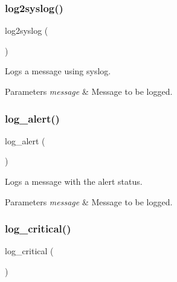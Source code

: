 \subsubsection{\texorpdfstring{log2syslog()}{log2syslog()}}
{\footnotesize\ttfamily log2syslog (\begin{DoxyParamCaption}\item[{message}]{ }\end{DoxyParamCaption})}



Logs a message using syslog. 


\begin{DoxyParams}{Parameters}
{\em message} & Message to be logged. \\
\hline
\end{DoxyParams}
\mbox{\label{group__log_ga36dd3783b9386bf202d2c81c24470466}} 
\subsubsection{\texorpdfstring{log\+\_\+alert()}{log\_alert()}}
{\footnotesize\ttfamily log\+\_\+alert (\begin{DoxyParamCaption}\item[{message}]{ }\end{DoxyParamCaption})}



Logs a message with the \textquotesingle{}alert\textquotesingle{} status. 


\begin{DoxyParams}{Parameters}
{\em message} & Message to be logged. \\
\hline
\end{DoxyParams}
\mbox{\label{group__log_ga2f066e08ce5a304ebadeb744a1a48841}} 
\subsubsection{\texorpdfstring{log\+\_\+critical()}{log\_critical()}}
{\footnotesize\ttfamily log\+\_\+critical (\begin{DoxyParamCaption}\item[{message}]{ }\end{DoxyParamCaption})}



